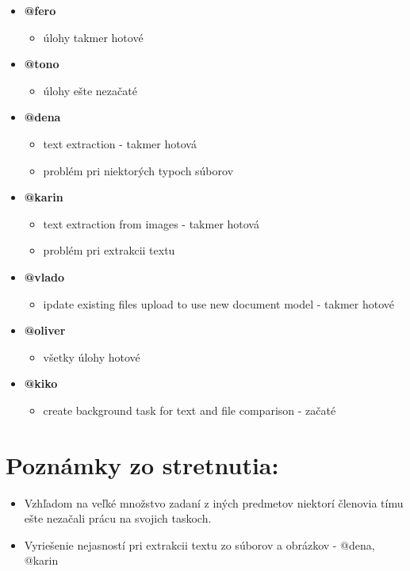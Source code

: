 \documentclass{article}
\begin{document}
    \begin{itemize}
        \item \textbf {@fero}
        \begin{itemize}
            \item úlohy takmer hotové
        \end{itemize}
        \item \textbf {@tono}
        \begin{itemize}
            \item úlohy ešte nezačaté 
        \end{itemize}
        \item \textbf {@dena}
        \begin{itemize}
            \item text extraction - takmer hotová
            \item problém pri niektorých typoch súborov
        \end{itemize}
        \item \textbf {@karin}
        \begin{itemize}
            \item text extraction from images - takmer hotová
            \item problém pri extrakcii textu
        \end{itemize}
        \item \textbf {@vlado}
        \begin{itemize}
            \item ipdate existing files upload to use new document model - takmer hotové
        \end{itemize}
        \item \textbf {@oliver}
        \begin{itemize}
            \item všetky úlohy hotové
        \end{itemize}
        \item \textbf {@kiko}
        \begin{itemize}
            \item create background task for text and file comparison - začaté
        \end{itemize}
    \end{itemize}    

    \section*{Poznámky zo stretnutia:}

    \begin{itemize}
        \item Vzhľadom na veľké množstvo zadaní z iných predmetov niektorí členovia tímu ešte nezačali prácu na svojich taskoch.
        \item Vyriešenie nejasností pri extrakcii textu zo súborov a obrázkov - @dena, @karin
    \end{itemize}
\end{document}

